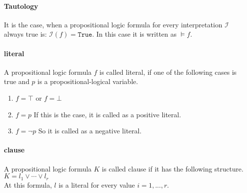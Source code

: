\paragraph{Tautology}
It is the case, when a propositional logic formula for every interpretation $\mathcal{I}$ always true is: $\mathcal{I}(f) = \texttt{True}$. In this case it is written as $\models f$.

\paragraph{literal}
A propositional logic formula $f$ is called literal, if one of the following cases is true and $p$ is a propositional-logical variable.

\begin{enumerate}
\item $f = \top$ or $f = \bot$
\item $f = p$ If this is the case, it is called as a positive literal.
\item $f = \neg p$ So it is called as a negative literal.
\end{enumerate}

\paragraph{clause}
A propositional logic formula $K$ is called clause if it has the following structure.
\\[0.2cm]
\hspace*{1.3cm} $K = l_1 \vee \cdots \vee l_r$ \\[0.2cm] At this formula, $l$ is a literal for every value $i=1,...,r$.

